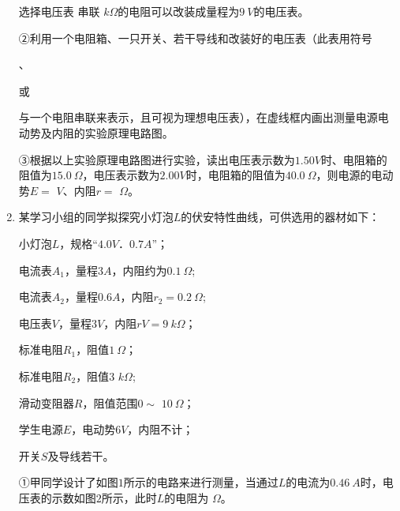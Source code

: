 \begin{enumerate}[leftmargin=0em]
选择电压表  
串联  
$ k \Omega $的电阻可以改装成量程为$ 9\ V $的电压表。 

②利用一个电阻箱、一只开关、若干导线和改装好的电压表（此表用符号
、
或
与一个电阻串联来表示，且可视为理想电压表），在虚线框内画出测量电源电动势及内阻的实验原理电路图。
\begin{figure}[h!]
\centering

\end{figure}



③根据以上实验原理电路图进行实验，读出电压表示数为$ 1.50V $时、电阻箱的阻值为$ 15.0 \ \Omega $，电压表示数为$ 2.00V $时，电阻箱的阻值为$ 40.0 \ \Omega $，则电源的电动势$ E= $  
$ V $、内阻$ r= $  
$ \Omega $。 




\newpage

\item 
{}
某学习小组的同学拟探究小灯泡$ L $的伏安特性曲线，可供选用的器材如下：

小灯泡$ L $，规格“$ 4.0V $．$ 0.7A $”；

电流表$ A_{1} $，量程$ 3A $，内阻约为$ 0.1 \ \Omega $; 

电流表$ A_{2} $，量程$ 0.6A $，内阻$ r_{2} =0.2 \ \Omega $;

电压表$ V $，量程$ 3V $，内阻$ rV=9 \ k\Omega $； 

标准电阻$ R_{1} $，阻值$ 1 \ \Omega $；

标准电阻$ R_{2} $，阻值$ 3 $ $ k \Omega $;

滑动变阻器$ R $，阻值范围$ 0 \sim $ $ 10 \ \Omega $；

学生电源$ E $，电动势$ 6V $，内阻不计；

开关$ S $及导线若干。

①甲同学设计了如图$ 1 $所示的电路来进行测量，当通过$ L $的电流为$ 0.46\ A $时，电压表的示数如图$ 2 $所示，此时$ L $的电阻为  
$ \Omega $。
\begin{figure}[h!]
\centering
 \qquad  \qquad  \qquad  
\end{figure}


\end{enumerate}
